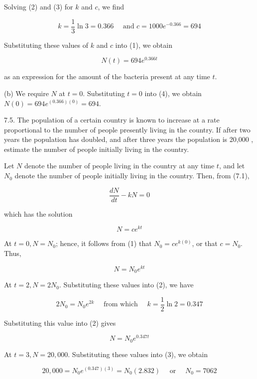 \documentclass[10pt]{article}
\begin{document}
Solving (2) and (3) for $k$ and $c$, we find

$$
k=\frac{1}{3} \ln 3=0.366 \quad \text { and } c=1000 e^{-0.366}=694
$$

Substituting these values of $k$ and $c$ into (1), we obtain


\begin{equation*}
N(t)=694 e^{0.366 t} \tag{4}
\end{equation*}


as an expression for the amount of the bacteria present at any time $t$.

(b) We require $N$ at $t=0$. Substituting $t=0$ into (4), we obtain $N(0)=694 e^{(0.366)(0)}=694$.

7.5. The population of a certain country is known to increase at a rate proportional to the number of people presently living in the country. If after two years the population has doubled, and after three years the population is 20,000 , estimate the number of people initially living in the country.

Let $N$ denote the number of people living in the country at any time $t$, and let $N_{0}$ denote the number of people initially living in the country. Then, from (7.1),

$$
\frac{d N}{d t}-k N=0
$$

which has the solution


\begin{equation*}
N=c e^{k t} \tag{1}
\end{equation*}


At $t=0, N=N_{0}$; hence, it follows from (1) that $N_{0}=c e^{k(0)}$, or that $c=N_{0}$. Thus,


\begin{equation*}
N=N_{0} e^{k t} \tag{2}
\end{equation*}


At $t=2, N=2 N_{0}$. Substituting these values into (2), we have

$$
2 N_{0}=N_{0} e^{2 k} \quad \text { from which } \quad k=\frac{1}{2} \ln 2=0.347
$$

Substituting this value into (2) gives


\begin{equation*}
N=N_{0} e^{0.347 t} \tag{3}
\end{equation*}


At $t=3, N=20,000$. Substituting these values into (3), we obtain

$$
20,000=N_{0} e^{(0.347)(3)}=N_{0}(2.832) \quad \text { or } \quad N_{0}=7062
$$
\end{document}
